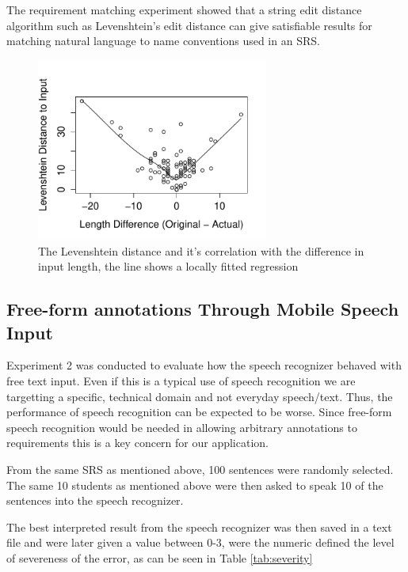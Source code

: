 \documentclass[conference]{IEEEtran}
\begin{document}
The requirement matching experiment showed that a string edit distance algorithm such as Levenshtein's edit distance can give satisfiable results for matching natural language to name conventions used in an SRS. 

\begin{figure}[!t]

\centering
\includegraphics[width=3in]{pdf/Rplot02.pdf}
\caption{The Levenshtein distance and it's correlation with the difference in input length, the line shows a locally fitted regression}
\label{fig:levdif}
\end{figure}

\subsection{Free-form annotations Through Mobile Speech Input}

Experiment 2 was conducted to evaluate how the speech recognizer behaved with free text input.
Even if this is a typical use of speech recognition we are targetting a specific, technical domain and not everyday speech/text.
Thus, the performance of speech recognition can be expected to be worse.
Since free-form speech recognition would be needed in allowing arbitrary annotations to requirements this is a key concern for our application.

From the same SRS as mentioned above, 100 sentences were randomly selected. 
The same 10 students as mentioned above were then asked to speak 10 of the sentences into the speech recognizer.

The best interpreted result from the speech recognizer was then saved in a text file and were later given a value between 0-3, were the numeric defined the level of severeness of the error, as can be seen in Table \ref{tab:severity}
\end{document}

